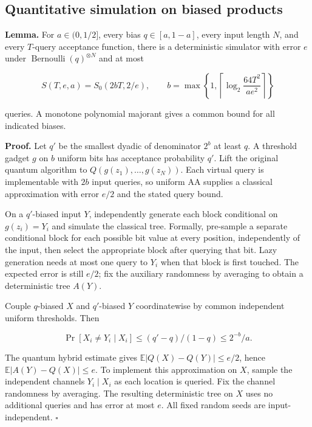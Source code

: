 \subsection{Quantitative simulation on biased
products}\label{exch:sec-2}

\textbf{Lemma.} For \(a\in(0,1/2]\), every bias \(q\in[a,1-a]\), every
input length \(N\), and every \(T\)-query acceptance function, there is
a deterministic simulator with error \(e\) under
\(\operatorname{Bernoulli}(q)^{\otimes N}\) and at most

\[
S(T,e,a)=S_0(2bT,2/e),\qquad
b=\max\left\{1,\left\lceil\log_2\frac{64T^2}{ae^2}\right\rceil\right\}
\]

queries. A monotone polynomial majorant gives a common bound for all
indicated biases.

\textbf{Proof.} Let \(q'\) be the smallest dyadic of denominator \(2^b\)
at least \(q\). A threshold gadget \(g\) on \(b\) uniform bits has
acceptance probability \(q'\). Lift the original quantum algorithm to
\(Q(g(z_1),\ldots,g(z_N))\). Each virtual query is implementable with
\(2b\) input queries, so uniform AA supplies a classical approximation
with error \(e/2\) and the stated query bound.

On a \(q'\)-biased input \(Y\), independently generate each block
conditional on \(g(z_i)=Y_i\) and simulate the classical tree. Formally,
pre-sample a separate conditional block for each possible bit value at
every position, independently of the input, then select the appropriate
block after querying that bit. Lazy generation needs at most one query
to \(Y_i\) when that block is first touched. The expected error is still
\(e/2\); fix the auxiliary randomness by averaging to obtain a
deterministic tree \(A(Y)\).

Couple \(q\)-biased \(X\) and \(q'\)-biased \(Y\) coordinatewise by
common independent uniform thresholds. Then

\[
\Pr[X_i\ne Y_i\mid X_i]\le(q'-q)/(1-q)\le2^{-b}/a.
\]

The quantum hybrid estimate gives \(\mathbb E|Q(X)-Q(Y)|\le e/2\), hence
\(\mathbb E|A(Y)-Q(X)|\le e\). To implement this approximation on \(X\),
sample the independent channels \(Y_i\mid X_i\) as each location is
queried. Fix the channel randomness by averaging. The resulting
deterministic tree on \(X\) uses no additional queries and has error at
most \(e\). All fixed random seeds are input-independent. \(\square\)
